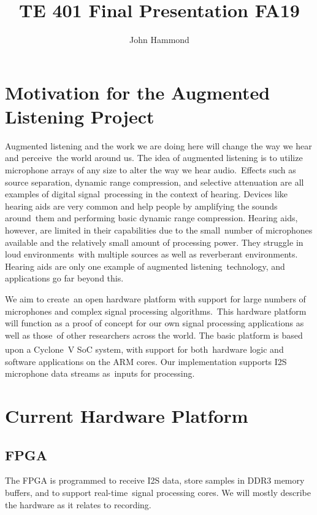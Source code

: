 \documentclass{article}
\author{John Hammond}
\title{TE 401 Final Presentation FA19}
\begin{document}
\maketitle
\tableofcontents
\newpage

\section{Motivation for the Augmented Listening Project}
Augmented listening and the work we are doing here will change the way we hear and perceive\
the world around us. The idea of augmented listening is to utilize microphone arrays of any size to alter the way we hear audio.\
Effects such as source separation, dynamic range compression, and selective attenuation are all examples of digital signal\
processing in the context of hearing. Devices like hearing aids are very common and help people by amplifying the sounds around\
them and performing basic dynamic range compression.  Hearing aids, however, are limited in their capabilities due to the small\
number of microphones available and the relatively small amount of processing power. They struggle in loud environments\
with multiple sources as well as reverberant environments.  Hearing aids are only one example of augmented listening\
technology, and applications go far beyond this.

We aim to create\
an open hardware platform with support for large numbers of microphones and complex signal processing algorithms.\
This hardware platform will function as a proof of concept for our own signal processing applications as well as those\
of other researchers across the world.  The basic platform is based upon a Cyclone\textsuperscript{\textregistered{}}\
V SoC system, with support for both\
hardware logic and software applications on the ARM cores. Our implementation supports I2S microphone data streams as\
inputs for processing.

\section{Current Hardware Platform}

\subsection{FPGA}
The FPGA is programmed to receive I2S data, store samples in DDR3 memory buffers, and to support real-time\
signal processing cores.  We will mostly describe the hardware as it relates to recording.
\end{document}
